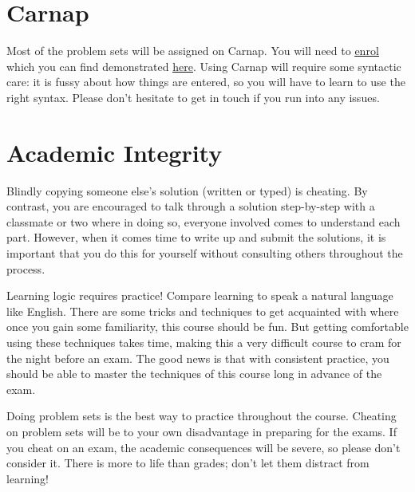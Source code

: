 \documentclass[letterpaper]{inzane_syllabus} %
\begin{document}
\section{Carnap}

Most of the problem sets will be assigned on Carnap.
You will need to \href{https://carnap.io/enroll/Logic%20I}{\underline{enrol}} which you can find demonstrated \href{https://youtu.be/lmkWcxqxEZk}{\underline{here}}.
Using Carnap will require some syntactic care: it is fussy about how things are entered, so you will have to learn to use the right syntax.
Please don't hesitate to get in touch if you run into any issues.


\newpage %

\makeSide %


\vspace{0.5cm}
\section{Academic Integrity}

Blindly copying someone else’s solution (written or typed) is cheating.
By contrast, you are encouraged to talk through a solution step-by-step with a classmate or two where in doing so, everyone involved comes to understand each part.
However, when it comes time to write up and submit the solutions, it is important that you do this for yourself without consulting others throughout the process.

Learning logic requires practice! 
Compare learning to speak a natural language like English. %
There are some tricks and techniques to get acquainted with where once you gain some familiarity, this course should be fun.
But getting comfortable using these techniques takes time, making this a very difficult course to cram for the night before an exam.
The good news is that with consistent practice, you should be able to master the techniques of this course long in advance of the exam.

Doing problem sets is the best way to practice throughout the course.
Cheating on problem sets will be to your own disadvantage in preparing for the exams.
If you cheat on an exam, the academic consequences will be severe, so please don't consider it.
There is more to life than grades; don't let them distract from learning!
\end{document}
